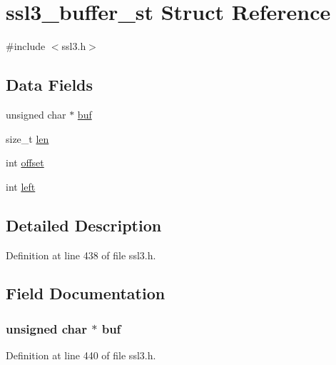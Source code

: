 \hypertarget{structssl3__buffer__st}{}\section{ssl3\+\_\+buffer\+\_\+st Struct Reference}
\label{structssl3__buffer__st}


{\ttfamily \#include $<$ssl3.\+h$>$}

\subsection*{Data Fields}
\begin{DoxyCompactItemize}
\item 
unsigned char $\ast$ \hyperlink{structssl3__buffer__st_a1333cf0fd17b5c2923d70bb1cb3ab4a4}{buf}
\item 
size\+\_\+t \hyperlink{structssl3__buffer__st_a7360b55975153b822efc5217b7734e6a}{len}
\item 
int \hyperlink{structssl3__buffer__st_aed7ea92f45bd273dde380a45ddced592}{offset}
\item 
int \hyperlink{structssl3__buffer__st_ad8f5e19e19f12974c9713e920ec54331}{left}
\end{DoxyCompactItemize}


\subsection{Detailed Description}


Definition at line 438 of file ssl3.\+h.



\subsection{Field Documentation}
\subsubsection[{\texorpdfstring{buf}{buf}}]{\setlength{\rightskip}{0pt plus 5cm}unsigned char $\ast$ buf}\hypertarget{structssl3__buffer__st_a1333cf0fd17b5c2923d70bb1cb3ab4a4}{}\label{structssl3__buffer__st_a1333cf0fd17b5c2923d70bb1cb3ab4a4}


Definition at line 440 of file ssl3.\+h.

